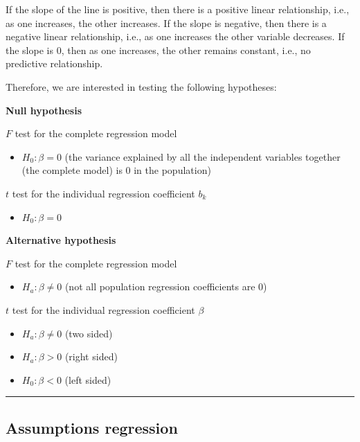 \documentclass[
]{article}
\providecommand{\tightlist}{%
  \setlength{\itemsep}{0pt}\setlength{\parskip}{0pt}}
\begin{document}
If the slope of the line is positive, then there is a positive linear relationship, i.e., as one increases, the other increases. If the slope is negative, then there is a negative linear relationship, i.e., as one increases the other variable decreases. If the slope is 0, then as one increases, the other remains constant, i.e., no predictive relationship.

Therefore, we are interested in testing the following hypotheses:

\textbf{Null hypothesis}

\(F\) test for the complete regression model

\begin{itemize}
\tightlist
\item
  \(H_0:\beta = 0\) (the variance explained by all the independent variables together (the complete model) is 0 in the population)
\end{itemize}

\(t\) test for the individual regression coefficient \(b_k\)

\begin{itemize}
\tightlist
\item
  \(H_0: \beta = 0\)
\end{itemize}

\textbf{Alternative hypothesis}

\(F\) test for the complete regression model

\begin{itemize}
\tightlist
\item
  \(H_a: \beta \neq 0\) (not all population regression coefficients are 0)
\end{itemize}

\(t\) test for the individual regression coefficient \(\beta\)

\begin{itemize}
\item
  \(H_a: \beta \neq 0\) (two sided)
\item
  \(H_a: \beta > 0\) (right sided)
\item
  \(H_0: \beta < 0\) (left sided)
\end{itemize}

\begin{center}\rule{0.5\linewidth}{0.5pt}\end{center}

\hypertarget{assumptions-regression}{%
\subsection{Assumptions regression}\label{assumptions-regression}}
\end{document}
